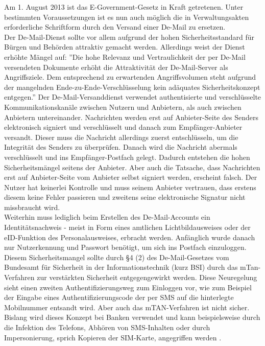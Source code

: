 Am 1. August 2013 ist das E-Government-Gesetz \cite{bea:e-government} in Kraft getretenen. Unter bestimmten Voraussetzungen ist es nun auch möglich die in Verwaltungsakten erforderliche Schriftform durch den Versand einer De-Mail zu ersetzen. \\
Der De-Mail-Dienst sollte vor allem aufgrund der hohen Sicherheitsstandard für Bürgen und Behörden attraktiv gemacht werden. Allerdings weist der Dienst erhöhte Mängel auf:
''Die hohe Relevanz und Vertraulichkeit der per De-Mail versendeten Dokumente erhöht die Attraktivität der De-Mail-Server als Angriffsziele. Dem entsprechend zu erwartenden Angriffsvolumen steht aufgrund der mangelnden Ende-zu-Ende-Verschlüsselung kein adäquates Sicherheitskonzept entgegen.'' \cite{bea:demail:ccc} Der De-Mail-Versanddienst verwendet authentisierte und verschlüsselte Kommunikationskanäle zwischen Nutzern und Anbietern, als auch zwischen Anbietern untereinander. Nachrichten werden erst auf Anbieter-Seite des Senders elektronisch signiert und verschlüsselt und danach zum Empfänger-Anbieter versandt. Dieser muss die Nachricht allerdings zuerst entschlüsseln, um die Integrität des Senders zu überprüfen. Danach wird die Nachricht abermals verschlüsselt und ins Empfänger-Postfach gelegt. Dadurch entstehen die hohen Sicherheitsmängel seitens der Anbieter. Aber auch die Tatsache, dass Nachrichten erst auf Anbieter-Seite vom Anbieter selbst signiert werden, erscheint falsch. Der Nutzer hat keinerlei Kontrolle und muss seinem Anbieter vertrauen, dass erstens diesem keine Fehler passieren und zweitens seine elektronische Signatur nicht missbraucht wird. \\
Weiterhin muss lediglich beim Erstellen des De-Mail-Accounts ein Identitätsnachweis - meist in Form eines amtlichen Lichtbildausweises oder der eID-Funktion des Personalausweises, erbracht werden. Anfänglich wurde danach nur Nutzerkennung und Passwort benötigt, um sich ins Postfach einzuloggen. Diesem Sicherheitsmangel sollte durch §4 (2) des De-Mail-Gesetzes vom Bundesamt für Sicherheit in der Informationstechnik (kurz BSI) durch das mTan-Verfahren zur verstärkten Sicherheit entgegengewirkt werden. Diese Neuregelung sieht einen zweiten Authentifizierungsweg zum Einloggen vor, wie zum Beispiel der Eingabe eines Authentifizierungscode der per SMS auf die hinterlegte Mobilnummer entsandt wird. Aber auch das mTAN-Verfahren ist nicht sicher. Bislang wird dieses Konzept bei Banken verwendet und kann beispielsweise durch die Infektion des Telefons, Abhören von SMS-Inhalten oder durch Impersonierung, sprich Kopieren der SIM-Karte, angegriffen werden \cite{bea:demail:brokenbydesign}. \\
